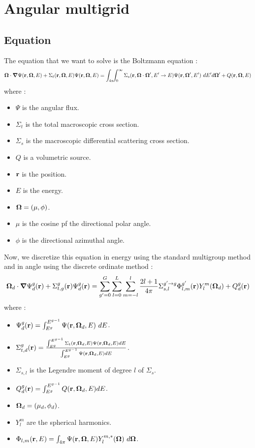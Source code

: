 \section{Angular multigrid}
\subsection{Equation} 
The equation that we want to solve is the Boltzmann equation :
\begin{equation}
\boldsymbol{\Omega} \cdot \boldsymbol{\nabla} \Psi(\mathbf{r},\boldsymbol{\Omega},E) + \Sigma_t(\mathbf{r},\boldsymbol{\Omega},E) \Psi(\mathbf{r},\boldsymbol{\Omega},E) =
\int_{4\pi}\!\!\int_{0}^{\infty}\Sigma_s(\mathbf{r},\boldsymbol{\Omega}\cdot\boldsymbol{\Omega}',E'\rightarrow
E)\Psi(\mathbf{r},\boldsymbol{\Omega}',E')\ dE'd\boldsymbol{\Omega}'+Q(\mathbf{r},\boldsymbol{\Omega},E) 
\label{transport}
\end{equation}
where :
\begin{itemize}
\item $\Psi$ is the angular flux.
\item $\Sigma_t$ is the total macroscopic cross section.
\item $\Sigma_s$ is the macroscopic differential scattering cross section.
\item $Q$ is a volumetric source.
\item $\mathbf{r}$ is the position.
\item $E$ is the energy.
\item $\boldsymbol{\Omega} = (\mu,\phi)$.
\item $\mu$ is the cosine pf the directional polar angle.
\item $\phi$ is the directional azimuthal angle.
\end{itemize}
Now, we discretize this equation in energy using the standard multigroup
method \cite{reuss} and in angle using the discrete ordinate method
\cite{reuss} :
\begin{equation}
\boldsymbol{\Omega}_d \cdot \boldsymbol{\nabla} \Psi_d^g(\mathbf{r}) + \Sigma_{t,g}^g(\mathbf{r}) \Psi_d^g(\mathbf{r}) = \sum_{g'=0}^G
\sum_{l=0}^L\sum_{m=-l}^l \frac{2l+1}{4\pi}\Sigma_{s,l}^{g'\rightarrow
g}\Phi_{l,m}^{g'}(\mathbf{r})Y_l^m(\boldsymbol{\Omega}_d) + Q_d^g(\mathbf{r})
\label{discretized}
\end{equation}
where :
\begin{itemize}
\item $\Psi_d^g(\br)=\int_{E^{g}}^{E^{g-1}}\Psi(\br,\bo_d,E)\ dE$.
\item $\Sigma_{t,d}^g(\mathbf{r}) = \frac{\int_{E^{g}}^{E^{g-1}}\Sigma_t(\mathbf{r},\boldsymbol{\Omega}_d,E)
\Psi(\mathbf{r},\boldsymbol{\Omega}_d,E) dE}{\int_{E^g}^{E^{g-1}}\Psi(\mathbf{r},\boldsymbol{\Omega}_d,E) dE}$.
\item $\Sigma_{s,l}$ is the Legendre moment of degree $l$ of $\Sigma_s$.
\item $Q_d^g(\mathbf{r}) = \int_{E^g}^{E^{g-1}}Q(\mathbf{r},\boldsymbol{\Omega}_d,E) dE$.
\item $\boldsymbol{\Omega}_d = (\mu_d,\phi_d)$.
\item $Y_l^m$ are the spherical harmonics.
\item $\Phi_{l,m}(\mathbf{r},E)= \int_{4\pi}\Psi(\mathbf{r},\boldsymbol{\Omega},E)Y_l^{m,*}(\boldsymbol{\Omega})\ d\boldsymbol{\Omega}$.
\end{itemize}
